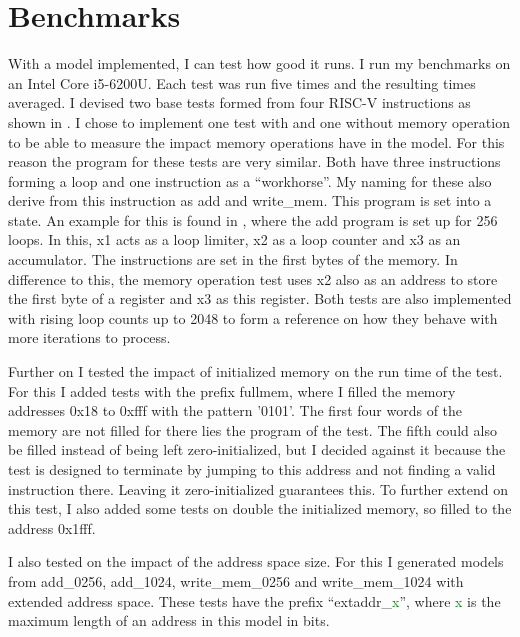 \chapter{Benchmarks}\label{chap:benchmarks}
With a model implemented, I can test how good it runs. I run my
benchmarks on an Intel Core i5-6200U. Each test was run five times
and the resulting times averaged. I devised two base tests formed
from four RISC-V instructions as shown in
. I chose to implement one test with and
one without memory operation to be able to measure the impact memory
operations have in the model. For this reason the program for these
tests are very similar. Both have three instructions forming a loop
and one instruction as a \enquote{workhorse}. My naming for these
also derive from this instruction as add and write\_mem. This program
is set into a state. An example for this is found in
, where the add program is set up for 256
loops. In this, x1 acts as a loop limiter, x2 as a loop counter and
x3 as an accumulator. The instructions are set in the first bytes of
the memory. In difference to this, the memory operation test uses x2
also as an address to store the first byte of a register and x3 as
this register. Both tests are also implemented with rising loop
counts up to 2048 to form a reference on how they behave with more
iterations to process.




Further on I tested the impact of initialized memory on the run time
of the test. For this I added tests with the prefix fullmem, where I
filled the memory addresses 0x18 to 0xfff with the pattern '0101'.
The first four words of the memory are not filled for there lies the
program of the test. The fifth could also be filled instead of being
left zero-initialized, but I decided against it because the test is
designed to terminate by jumping to this address and not finding a
valid instruction there. Leaving it zero-initialized guarantees this.
To further extend on this test, I also added some tests on double the
initialized memory, so filled to the address 0x1fff.

I also tested on the impact of the address space size. For this I
generated models from add\_0256, add\_1024, write\_mem\_0256 and
write\_mem\_1024 with extended address space. These tests have the
prefix \enquote{extaddr\_\textcolor{Green}{x}}, where
\textcolor{Green}{x} is the maximum length of an address in this
model in bits.

